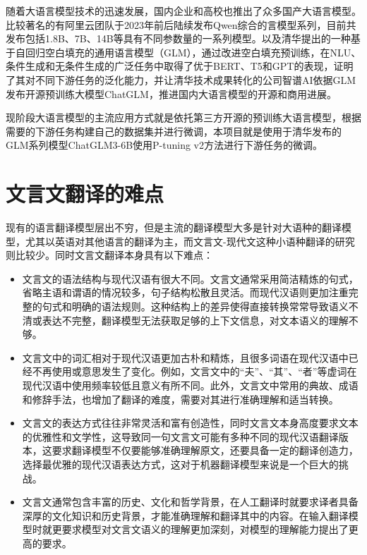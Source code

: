 \documentclass[
    decl-page,  %
    ,fontset = win, %
  ]{njuthesis}
\begin{document}
随着大语言模型技术的迅速发展，国内企业和高校也推出了众多国产大语言模型。比较著名的有阿里云团队于2023年前后陆续发布Qwen综合的言模型系列\cite{bai2023qwen}，目前共发布包括1.8B、7B、14B等具有不同参数量的一系列模型。以及清华提出的一种基于自回归空白填充的通用语言模型（GLM）\cite{du2021glm}，通过改进空白填充预训练，在NLU、条件生成和无条件生成的广泛任务中取得了优于BERT、T5和GPT的表现，证明了其对不同下游任务的泛化能力，并让清华技术成果转化的公司智谱AI依据GLM发布开源预训练大模型ChatGLM，推进国内大语言模型的开源和商用进展。

现阶段大语言模型的主流应用方式就是依托第三方开源的预训练大语言模型，根据需要的下游任务构建自己的数据集并进行微调，本项目就是使用于清华发布的GLM系列模型ChatGLM3-6B使用P-tuning v2方法\cite{liu2021p}进行下游任务的微调。

\section{文言文翻译的难点}
现有的语言翻译模型层出不穷，但是主流的翻译模型大多是针对大语种的翻译模型，尤其以英语对其他语言的翻译为主，而文言文-现代文这种小语种翻译的研究则比较少。同时文言文翻译本身具有以下难点：
\begin{itemize}
    \item 文言文的语法结构与现代汉语有很大不同。文言文通常采用简洁精炼的句式，省略主语和谓语的情况较多，句子结构松散且灵活。而现代汉语则更加注重完整的句式和明确的语法规则。这种结构上的差异使得直接转换常常导致语义不清或表达不完整，翻译模型无法获取足够的上下文信息，对文本语义的理解不够。
    \item 文言文中的词汇相对于现代汉语更加古朴和精炼，且很多词语在现代汉语中已经不再使用或意思发生了变化。例如，文言文中的“夫”、“其”、“者”等虚词在现代汉语中使用频率较低且意义有所不同。此外，文言文中常用的典故、成语和修辞手法，也增加了翻译的难度，需要对其进行准确理解和适当转换。
    \item 文言文的表达方式往往非常灵活和富有创造性，同时文言文本身高度要求文本的优雅性和文学性，这导致同一句文言文可能有多种不同的现代汉语翻译版本，这要求翻译模型不仅要能够准确理解原文，还要具备一定的翻译创造力，选择最优雅的现代汉语表达方式，这对于机器翻译模型来说是一个巨大的挑战。
    \item 文言文通常包含丰富的历史、文化和哲学背景，在人工翻译时就要求译者具备深厚的文化知识和历史背景，才能准确理解和翻译其中的内容。在输入翻译模型时就更要求模型对文言文语义的理解更加深刻，对模型的理解能力提出了更高的要求。
\end{itemize}
\end{document}
